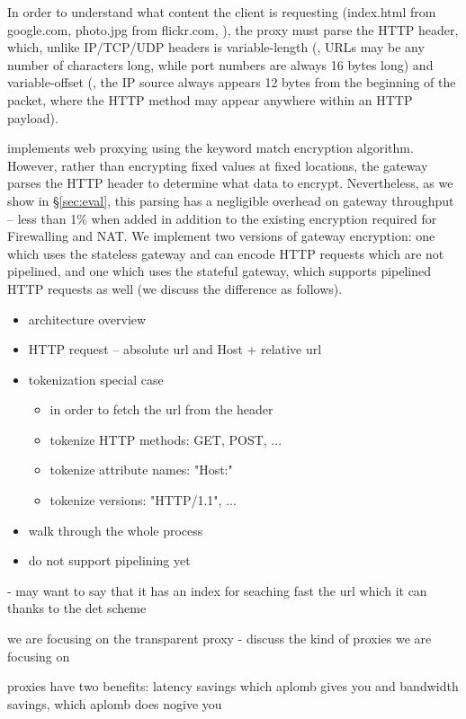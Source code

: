 In order to understand what content the client is requesting (index.html from google.com, photo.jpg from flickr.com, \etc{}), the proxy must parse the HTTP header, which, unlike IP/TCP/UDP headers is variable-length (\eg{}, URLs may be any number of characters long, while port numbers are always 16 bytes long) and variable-offset (\eg{}, the IP source always appears 12 bytes from the beginning of the packet, where the HTTP method may appear anywhere within an HTTP payload).

\sys implements web proxying using the keyword match encryption algorithm. 
However, rather than encrypting fixed values at fixed locations, the \sys gateway parses the HTTP header to determine what data to encrypt.
Nevertheless, as we show in \S\ref{sec:eval}, this parsing has a negligible overhead on gateway throughput -- less than 1\% when added in addition to the existing encryption required for Firewalling and NAT.
We implement two versions of gateway encryption: one which uses the stateless gateway and can encode HTTP requests which are not pipelined, and one which uses the stateful gateway, which supports pipelined HTTP requests as well (we discuss the difference as follows).

\begin{itemize}
\item architecture overview
\item HTTP request -- absolute url and Host + relative url
\item tokenization special case \\
    \begin{itemize}
    \item in order to fetch the url from the header
    \item tokenize HTTP methods: GET, POST, ...
    \item tokenize attribute names: "Host:"
    \item tokenize versions: "HTTP/1.1", ...
    \end{itemize}
\item walk through the whole process
\item do not support pipelining yet
\end{itemize}

- may want to say that it has an index for seaching fast the url which it can thanks to the det scheme


we are focusing on the transparent proxy
- discuss the kind of proxies we are focusing on

proxies have two benefits: latency savings which aplomb gives you 
and bandwidth savings, which aplomb does nogive you
 
